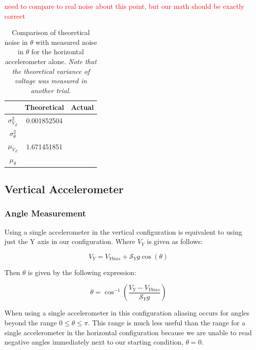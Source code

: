 \documentclass{article}
\newcommand{\xxx}[1]{\textcolor{red}{#1}}
\theoremstyle{plain}
\theoremstyle{definition}
\theoremstyle{remark}
\newcommand{\Sens}{\mathcal{S}}
\begin{document}
\xxx{need to compare to real noise about this point, but our math should be exactly correct}

\begin{table}
\begin{center}
    \begin{tabular}{|c|c|c|}
        \hline
        ~                   & Theoretical  & Actual \\ \hline
        $\sigma^2_{V_{Z}}$    & 0.001852504            & ~      \\ 
        $\sigma^2_{\theta}$ & ~            & ~      \\ 
        $\mu_{V_{Z}}$       & 1.671451851            & ~      \\ 
        $\mu_{\theta}$      & ~            & ~      \\
        \hline
    \end{tabular}
\label{Noise_horizontal_T}
\caption{Comparison of theoretical noise in $\theta$ with measured noise in $\theta$ for the horizontal accelerometer alone. \emph{Note that the theoretical variance of voltage was measured in another trial.}}
\end{center}
\end{table}

\subsection{Vertical Accelerometer}

\subsubsection{Angle Measurement}

Using a single accelerometer in the vertical configuration is equivalent to using just the Y axis in our configuration.  Where $V_{Y}$ is given as follows:

$$ V_{Y} = V_{Ybias} + \Sens_{Y} g \cos(\theta) $$

Then $\theta$ is given by the following expression:

\begin{equation}
\theta = \cos^{-1}\left( \frac{V_{Y} - V_{Ybias}}{\Sens_{Y} g}\right)
\label{verticalEQ}
\end{equation}

When using a single accelerometer in this configuration aliasing occurs for angles beyond the range $0 \leq \theta \leq \pi$.  This range is much less useful than the range for a single accelerometer in the horizontal configuration because we are unable to read negative angles immediately next to our starting condition, $\theta = 0$. 
\end{document}
